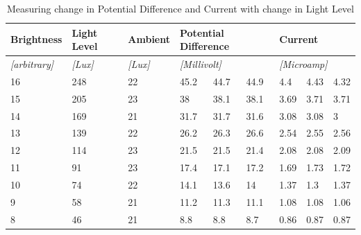 \documentclass{article}
\begin{document}
\begin{table}[!ht]
\centering
\caption{Measuring change in Potential Difference and Current with change in Light Level}
\label{my-label}
\begin{tabular}{|l|l|l|l|l|l|l|l|l|}
\hline
\textbf{Brightness}      & \textbf{Light Level} & \textbf{Ambient}   & \multicolumn{3}{l|}{\textbf{Potential Difference}} & \multicolumn{3}{l|}{\textbf{Current}}        \\ \hline
\textit{{[}arbitrary{]}} & \textit{{[}Lux{]}}   & \textit{{[}Lux{]}} & \multicolumn{3}{l|}{\textit{{[}Millivolt{]}}}      & \multicolumn{3}{l|}{\textit{{[}Microamp{]}}} \\ \hline
16                       & 248                  & 22                 & 45.2            & 44.7            & 44.9           & 4.4            & 4.43         & 4.32         \\ \hline
15                       & 205                  & 23                 & 38              & 38.1            & 38.1           & 3.69           & 3.71         & 3.71         \\ \hline
14                       & 169                  & 21                 & 31.7            & 31.7            & 31.6           & 3.08           & 3.08         & 3            \\ \hline
13                       & 139                  & 22                 & 26.2            & 26.3            & 26.6           & 2.54           & 2.55         & 2.56         \\ \hline
12                       & 114                  & 23                 & 21.5            & 21.5            & 21.4           & 2.08           & 2.08         & 2.09         \\ \hline
11                       & 91                   & 23                 & 17.4            & 17.1            & 17.2           & 1.69           & 1.73         & 1.72         \\ \hline
10                       & 74                   & 22                 & 14.1            & 13.6            & 14             & 1.37           & 1.3          & 1.37         \\ \hline
9                        & 58                   & 21                 & 11.2            & 11.3            & 11.1           & 1.08           & 1.08         & 1.06         \\ \hline
8                        & 46                   & 21                 & 8.8             & 8.8             & 8.7            & 0.86           & 0.87         & 0.87         \\ \hline

\end{tabular}
\end{table}
\end{document}
